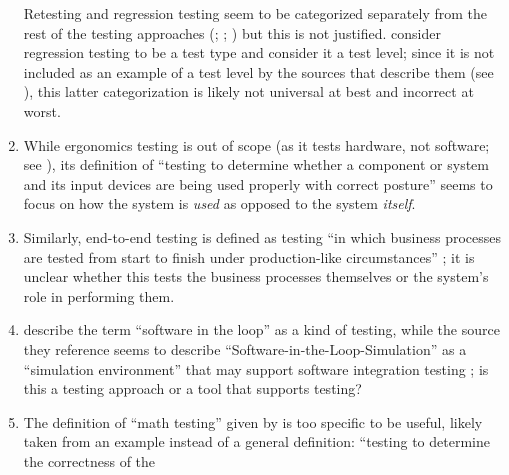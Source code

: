 \begin{enumerate}
          Retesting and regression testing seem to be categorized separately
          from the rest of the testing approaches (\citealp[pp.~15, 23]{IEEE2022};
          \citeyear[p.~8]{IEEE2021a}; \citeyear[p.~4]{IEEE2021b}) but this is
          not justified. \citetISTQB{} consider regression testing to be a test
          type and \citet[p.~3]{BarbosaEtAl2006} consider it a test level;
          since it is not included as an example of a test level by the sources
          that describe them (see ), this latter categorization
          is likely not universal at best and incorrect at worst.
    \item %
          While ergonomics testing is out of scope (as it tests hardware, not
          software; see ), its definition of ``testing to
          determine whether a component or system and its input devices are
          being used properly with correct posture'' \citepISTQB{} seems to
          focus on how the system is \emph{used} as opposed to the system
          \emph{itself}.
    \item %
          Similarly, end-to-end testing is defined as testing ``in which
          business processes are tested from start to finish under
          production-like circumstances'' \citepISTQB{}; it is unclear
          whether this tests the business processes themselves or the system's
          role in performing them.
    \item %
          \citetISTQB{} describe the term ``software in the loop'' as a kind of
          testing, while the source they reference seems to
          describe ``Software-in-the-Loop-Simulation'' as a ``simulation
          environment'' that may support software integration testing
          \citep[p.~153]{SPICE2022}; is this a testing approach or a tool
          that supports testing?
    \item %
          The definition of ``math testing'' given by \citetISTQB{} is
          too specific to be useful, likely taken from an example instead of
          a general definition: ``testing to determine the correctness of the

\end{enumerate}
